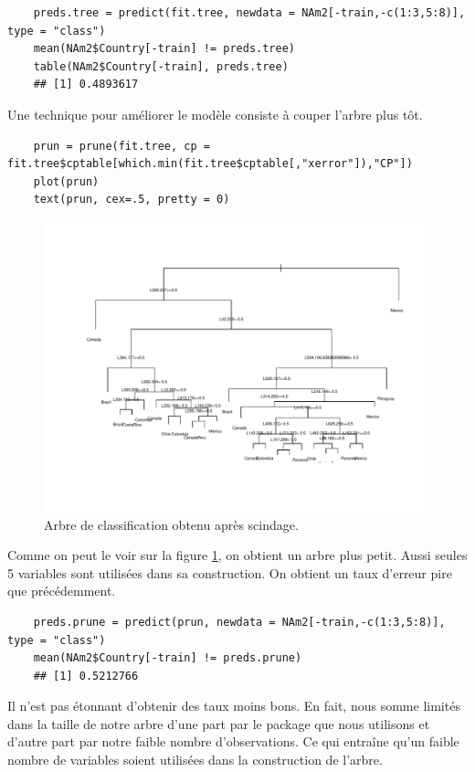 \documentclass[12pt,a4paper]{article}
\begin{document}
\begin{lstlisting}
	preds.tree = predict(fit.tree, newdata = NAm2[-train,-c(1:3,5:8)], type = "class")
	mean(NAm2$Country[-train] != preds.tree)
	table(NAm2$Country[-train], preds.tree)
	## [1] 0.4893617
\end{lstlisting}
Une technique pour améliorer le modèle consiste à couper l'arbre plus tôt.\vspace{2mm}
\begin{lstlisting}
	prun = prune(fit.tree, cp = fit.tree$cptable[which.min(fit.tree$cptable[,"xerror"]),"CP"])
	plot(prun)
	text(prun, cex=.5, pretty = 0)
\end{lstlisting}
\begin{figure}[h!]
	\begin{center}
		\includegraphics[scale=0.6]{figures/tree.pdf}
		\caption{Arbre de classification obtenu après scindage.}
		\label{fig:prune_tree}
	\end{center}
\end{figure}
Comme on peut le voir sur la figure \ref{fig:prune_tree}, on obtient un arbre plus petit. Aussi seules 5 variables sont utilisées dans sa construction. On obtient un taux d'erreur pire que précédemment.\vspace{2mm}
\begin{lstlisting}
	preds.prune = predict(prun, newdata = NAm2[-train,-c(1:3,5:8)], type = "class")
	mean(NAm2$Country[-train] != preds.prune)
	## [1] 0.5212766
\end{lstlisting}
Il n'est pas étonnant d'obtenir des taux moins bons. En fait, nous somme limités dans la taille de notre arbre d'une part par le package que nous utilisons et d'autre part par notre faible nombre d'observations. Ce qui entraîne qu'un faible nombre de variables soient utilisées dans la construction de l'arbre.
\end{document}

